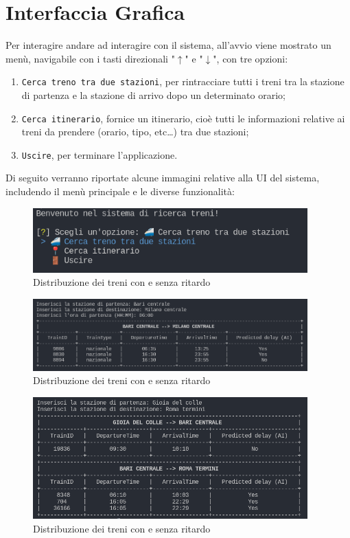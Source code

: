 \documentclass[italian,12pt,a4paper]{article}
\begin{document}
	\section{Interfaccia Grafica}
	Per interagire andare ad interagire con il sistema, all'avvio viene mostrato un menù, navigabile con i tasti direzionali "$\uparrow$" e "$\downarrow$", con tre opzioni:
	
		\begin{enumerate}
			\item \texttt{Cerca treno tra due stazioni}, per rintracciare tutti i treni tra la stazione di partenza e la stazione di arrivo dopo un determinato orario;
			\item \texttt{Cerca itinerario}, fornice un itinerario, cioè tutti le informazioni relative ai treni da prendere (orario, tipo, etc\dots) tra due stazioni;
			\item \texttt{Uscire}, per terminare l'applicazione.
		\end{enumerate} 
		Di seguito verranno riportate alcune immagini relative alla UI del sistema, includendo il menù principale e le diverse funzionalità:
		
		\begin{figure}[!h]
			\centering
			\includegraphics[width=400px]{img/main_menu}
			\caption{Distribuzione dei treni con e senza ritardo}
		\end{figure}

		\begin{figure}[!h]
			\centering
			\includegraphics[width=400px]{img/search_train}
			\caption{Distribuzione dei treni con e senza ritardo}
		\end{figure}

		\begin{figure}[!h]
			\centering
			\includegraphics[width=400px]{img/search_itin}
			\caption{Distribuzione dei treni con e senza ritardo}
		\end{figure}
		
\end{document}
